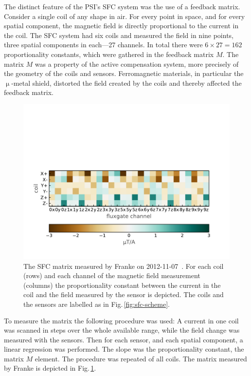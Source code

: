 The distinct feature of the PSI's SFC system was the use of a feedback matrix. Consider a single coil of any shape in air. For every point in space, and for every spatial component, the magnetic field is directly proportional to the current in the coil. The SFC system had six coils and measured the field in nine points, three spatial components in each---27 channels. In total there were $6 \times 27 = 162$ proportionality constants, which were gathered in the feedback matrix $M$. The matrix $M$ was a property of the active compensation system, more precisely of the geometry of the coils and sensors. Ferromagnetic materials, in particular the $\upmu$-metal shield, distorted the field created by the coils and thereby affected the feedback matrix.


\begin{figure}
  \centering
  \includegraphics[width=.8\linewidth]{gfx/nEDM_SFC/nEDM_SFC_matrix}
  \caption{The SFC matrix measured by Franke on 2012-11-07~\cite{Franke2013}. For each coil (rows) and each channel of the magnetic field measurement (columns) the proportionality constant between the current in the coil and the field measured by the sensor is depicted. The coils and the sensors are labelled as in Fig.\,\ref{fig:sfc-scheme}.}
  \label{fig:nEDM_SFC_matrix}
\end{figure}

To measure the matrix the following procedure was used: A current in one coil was scanned in steps over the whole available range, while the field change was measured with the sensors. Then for each sensor, and each spatial component, a linear regression was performed. The slope was the proportionality constant, the matrix $M$ element. The procedure was repeated of all coils. The matrix measured by Franke is depicted in Fig.\,\ref{fig:nEDM_SFC_matrix}.

